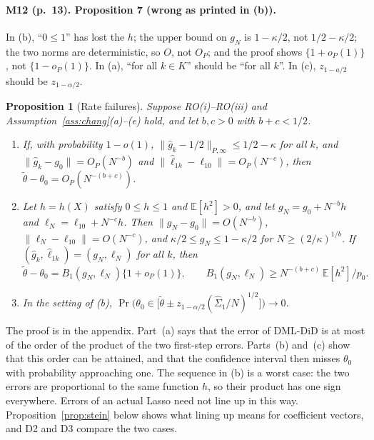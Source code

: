 \documentclass[11pt]{article}
\providecommand{\E}{\mathbb{E}}
\newenvironment{ins}{\begin{leftbar}}{\end{leftbar}}
\theoremstyle{plain}
\newtheorem{proposition}[lemma]{Proposition}
\theoremstyle{remark}
\begin{document}
\paragraph{M12 (p.~13). Proposition 7 (wrong as printed in (b)).}
In (b), ``$0\le1$'' has lost the $h$; the upper bound on $g_N$ is $1-\kappa/2$,
not $1/2-\kappa/2$; the two norms are deterministic, so $O$, not $O_P$; and the
proof shows $\{1+o_P(1)\}$, not $\{1-o_P(1)\}$. In (a), ``for all $k\in K$''
should be ``for all $k$''. In (c), $z_{1-a/2}$ should be $z_{1-\alpha/2}$.
\begin{ins}
\begin{proposition}[Rate failures] %
Suppose RO(i)--RO(iii) and Assumption~\ref{ass:chang}(a)--(e) hold, and let
$b,c>0$ with $b+c<1/2$.
\begin{enumerate}
\item[(a)] If, with probability $1-o(1)$, $\|\hat g_k-1/2\|_{P,\infty}\le1/2-\kappa$
  for all $k$, and $\|\hat g_k-g_0\|=O_P(N^{-b})$ and
  $\|\hat\ell_{1k}-\ell_{10}\|=O_P(N^{-c})$, then
  $\tilde\theta-\theta_0=O_P(N^{-(b+c)})$.
\item[(b)] Let $h=h(X)$ satisfy $0\le h\le1$ and $\E[h^2]>0$, and let
  $g_N=g_0+N^{-b}h$ and $\ell_N=\ell_{10}+N^{-c}h$. Then
  $\|g_N-g_0\|=O(N^{-b})$, $\|\ell_N-\ell_{10}\|=O(N^{-c})$, and
  $\kappa/2\le g_N\le1-\kappa/2$ for $N\ge(2/\kappa)^{1/b}$. If
  $(\hat g_k,\hat\ell_{1k})=(g_N,\ell_N)$ for all $k$, then
  \[
    \tilde\theta-\theta_0=B_1(g_N,\ell_N)\{1+o_P(1)\},\qquad
    B_1(g_N,\ell_N)\ge N^{-(b+c)}\,\E[h^2]/p_0 .
  \]
\item[(c)] In the setting of (b),
  $\Pr\big(\theta_0\in\big[\tilde\theta\pm z_{1-\alpha/2}(\hat\Sigma_1/N)^{1/2}\big]\big)\to0$.
\end{enumerate}
\end{proposition}
The proof is in the appendix. Part~(a) says that the error of DML-DiD is at most
of the order of the product of the two first-step errors. Parts~(b) and~(c) show
that this order can be attained, and that the confidence interval then misses
$\theta_0$ with probability approaching one. The sequence in (b) is a worst
case: the two errors are proportional to the same function $h$, so their product
has one sign everywhere. Errors of an actual Lasso need not line up in this way.
Proposition~\ref{prop:stein} below shows what lining up means for coefficient
vectors, and D2 and D3 compare the two cases.
\end{ins}
\end{document}
